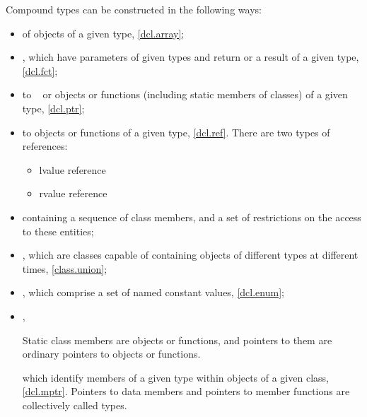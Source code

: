 \pnum
{}%
Compound types can be constructed in the following ways:
\begin{itemize}
\item {} of objects of a given type, \ref{dcl.array};

\item {}, which have parameters of given types and return
 or a result of a given type, \ref{dcl.fct};

\item {} to \cv{}~ or objects or functions (including
static members of classes) of a given type, \ref{dcl.ptr};

\item
{}%
%
 to objects or functions of a given
type, \ref{dcl.ref}. There are two types of references:
\begin{itemize}
\item lvalue reference
\item rvalue reference
\end{itemize}

\item
{} containing a sequence of class members,
and a set of restrictions
on the access to these entities;

\item
{}, which are classes capable of containing objects of
different types at different times, \ref{class.union};

\item
{},
which comprise a set of named constant values, \ref{dcl.enum};

\item
{}%
,%
\begin{footnote}
Static class members are objects or functions, and pointers to them are
ordinary pointers to objects or functions.
\end{footnote}
which identify members of a given
type within objects of a given class, \ref{dcl.mptr}.
Pointers to data members and pointers to member functions are collectively
called  types.
\end{itemize}

